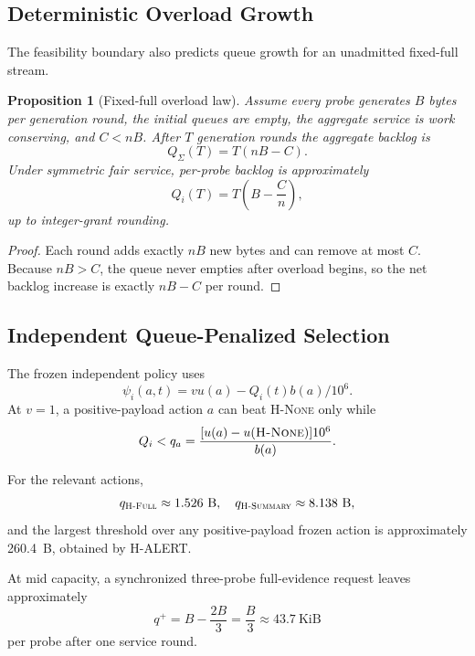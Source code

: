 \documentclass[10pt,journal]{IEEEtran}
\newtheorem{proposition}{Proposition}
\newcommand{\Hnone}{\textsc{H-None}}
\newcommand{\Hsummary}{\textsc{H-Summary}}
\newcommand{\Hfull}{\textsc{H-Full}}
\begin{document}
\subsection{Deterministic Overload Growth}

The feasibility boundary also predicts queue growth for an unadmitted
fixed-full stream.

\begin{proposition}[Fixed-full overload law]
\label{prop:overload}
Assume every probe generates $B$ bytes per generation round, the initial
queues are empty, the aggregate service is work conserving, and
$C<nB$. After $T$ generation rounds the aggregate backlog is
\begin{equation}
Q_\Sigma(T)=T(nB-C).
\label{eq:overload}
\end{equation}
Under symmetric fair service, per-probe backlog is
approximately
\begin{equation}
Q_i(T)
=
T\left(B-\frac{C}{n}\right),
\label{eq:overload_probe}
\end{equation}
up to integer-grant rounding.
\end{proposition}

\begin{proof}
Each round adds exactly $nB$ new bytes and can remove at most $C$.
Because $nB>C$, the queue never empties after overload begins, so the
net backlog increase is exactly $nB-C$ per round.
\end{proof}

\subsection{Independent Queue-Penalized Selection}

The frozen independent policy uses
\begin{equation}
\psi_i(a,t)
=
v u(a)-Q_i(t)b(a)/10^6 .
\end{equation}
At $v=1$, a positive-payload action $a$ can beat \Hnone{} only while
\begin{equation}
Q_i
<
q_a
=
\frac{[u(a)-u(\Hnone)]10^6}{b(a)} .
\label{eq:threshold}
\end{equation}

For the relevant actions,
\[
q_{\Hfull}\approx1.526~\mathrm{B},
\quad
q_{\Hsummary}\approx8.138~\mathrm{B},
\]
and the largest threshold over any positive-payload frozen action is
approximately 260.4~B, obtained by H-ALERT.

At mid capacity, a synchronized three-probe full-evidence request leaves
approximately
\begin{equation}
q^+
=
B-\frac{2B}{3}
=
\frac{B}{3}
\approx43.7~\mathrm{KiB}
\end{equation}
per probe after one service round.
\end{document}
